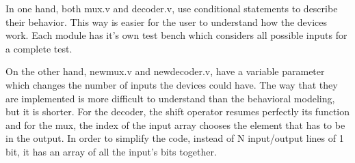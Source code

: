 In one hand, both mux.v and decoder.v, use conditional statements to describe their behavior. This way is easier for the user to understand how the devices work.
Each module has it's own test bench which considers all possible inputs for a complete test.

On the other hand, newmux.v and newdecoder.v, have a variable parameter which changes the number of inputs the devices could have. The way that they are implemented is more difficult to understand than the behavioral modeling, but it is shorter. For the decoder, the shift operator resumes perfectly its function and for the mux, the index of the input array chooses the element that has to be in the output.
In order to simplify the code, instead of N input/output lines of 1 bit, it has an array of all the input's bits together. 
  

